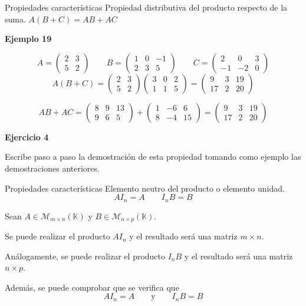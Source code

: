 \documentclass[
  ignorenonframetext,
]{beamer}
\begin{document}
\begin{frame}{Propiedades características}
\protect\hypertarget{propiedades-caracteruxedsticas-11}{}
Propiedad distributiva del producto respecto de la suma.
\(A(B+C) = AB+AC\)

\textbf{Ejemplo 19}

\[A = \begin{pmatrix}2&3\\5&2\end{pmatrix}\qquad B=\begin{pmatrix}1&0&-1\\2&3&5\end{pmatrix}\qquad C=\begin{pmatrix}2&0&3\\-1&-2&0\end{pmatrix}\]
\[A(B+C) = \begin{pmatrix}2&3\\5&2\end{pmatrix}\begin{pmatrix}3&0&2\\1&1&5\end{pmatrix} =\begin{pmatrix}9&3&19\\17&2&20\end{pmatrix} \]

\[AB+AC = \begin{pmatrix}8&9&13\\9&6&5\end{pmatrix}+\begin{pmatrix}1&-6&6\\8&-4&15\end{pmatrix} = \begin{pmatrix}9&3&19\\17&2&20\end{pmatrix}\]

\textbf{Ejercicio 4}

Escribe paso a paso la demostración de esta propiedad tomando como
ejemplo las demostraciones anteriores.
\end{frame}

\begin{frame}{Propiedades características}
\protect\hypertarget{propiedades-caracteruxedsticas-12}{}
Elemento neutro del producto o elemento unidad.
\[AI_n = A\qquad I_nB = B\]

Sean \(A\in\mathcal{M}_{m\times n}(\mathbb{K})\) y
\(B\in\mathcal{M}_{n\times p}(\mathbb{K})\).

Se puede realizar el producto \(AI_n\) y el resultado será una matriz
\(m\times n\).

Análogamente, se puede realizar el producto \(I_nB\) y el resultado será
una matriz \(n\times p\).

Además, se puede comprobar que se verifica que
\[AI_n = A\qquad\text{y}\qquad I_nB=B\]
\end{frame}
\end{document}
